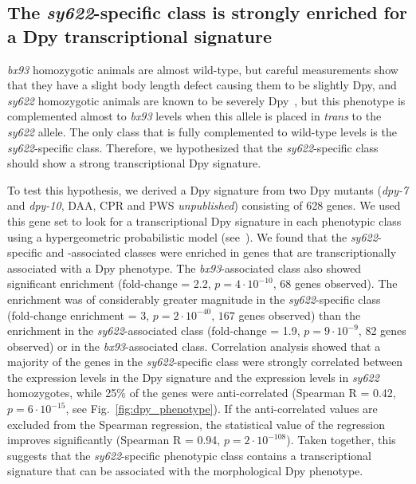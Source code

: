 \documentclass[10pt, twocolumn]{article}
\newcommand{\gene}[1]{\mbox{\emph{#1}}}
\begin{document}
\subsection*{The \emph{sy622}-specific class is strongly enriched for a Dpy
             transcriptional signature}
\emph{bx93} homozygotic animals are almost wild-type, but careful measurements
show that they have a slight body length defect causing them to be slightly Dpy,
and \emph{sy622} homozygotic animals are known to be severely
Dpy~\cite{Moghal2003}, but this phenotype is complemented almost to \emph{bx93}
levels when this allele is placed in \emph{trans} to the \emph{sy622} allele.
The only class that is fully complemented to wild-type levels is the
\emph{sy622}-specific class. Therefore, we hypothesized that the
\emph{sy622}-specific class should show a strong transcriptional Dpy signature.

To test this hypothesis, we derived a Dpy signature from two Dpy mutants
(\gene{dpy-7} and \gene{dpy-10}, DAA, CPR and PWS \emph{unpublished}) consisting
of 628 genes. We used this gene set to look for a transcriptional Dpy signature
in each phenotypic class using a hypergeometric probabilistic model
(see~). We found that the \emph{sy622}-specific and
-associated classes were enriched in genes that are transcriptionally associated
with a Dpy phenotype. The \emph{bx93}-associated class also showed significant
enrichment (fold-change = 2.2, $p=4\cdot10^{-10}$, 68 genes observed). The
enrichment was of considerably greater magnitude in the \emph{sy622}-specific
class (fold-change enrichment = 3, $p=2\cdot 10^{-40}$, $167$ genes observed)
than the enrichment in the \emph{sy622}-associated class (fold-change = 1.9,
$p=9\cdot10^{-9}$, 82 genes observed) or in the \emph{bx93}-associated class.
Correlation analysis showed that a majority of the genes in the
\emph{sy622}-specific class were strongly correlated between the expression
levels in the Dpy signature and the expression levels in \emph{sy622}
homozygotes, while 25\% of the genes were anti-correlated (Spearman R = 0.42,
$p=6\cdot10^{-15}$, see Fig.~\ref{fig:dpy_phenotype}). If the anti-correlated
values are excluded from the Spearman regression, the statistical value of the
regression improves significantly (Spearman R = 0.94, $p=2\cdot10^{-108}$).
Taken together, this suggests that the \emph{sy622}-specific phenotypic class
contains a transcriptional signature that can be associated with the
morphological Dpy phenotype.
\end{document}
